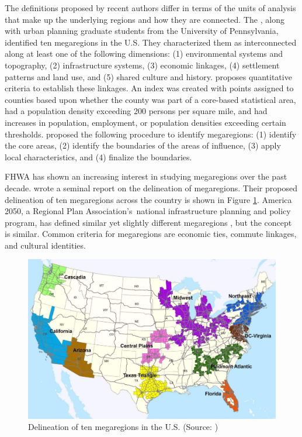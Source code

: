 The definitions proposed by recent authors differ in terms of the units of analysis that make up the underlying regions and how they are connected. The \cite{rpa06}, along with urban planning graduate students from the University of Pennsylvania, identified ten megaregions in the U.S. They characterized them as interconnected along at least one of the following dimensions: (1) environmental systems and topography, (2) infrastructure systems, (3) economic linkages, (4) settlement patterns and land use, and (5) shared culture and history. \cite{hagler09} proposes quantitative criteria to establish these linkages. An index was created with points assigned to counties based upon whether the county was part of a core-based statistical area, had a population density exceeding 200 persons per square mile, and had increases in population, employment, or population densities exceeding certain thresholds. \cite{ross08} proposed the following procedure to identify megaregions: (1) identify the core areas, (2) identify the boundaries of the areas of influence, (3) apply local characteristics, and (4) finalize the boundaries.

FHWA has shown an increasing interest in studying megaregions over the past decade. \cite{ross09c} wrote a seminal report on the delineation of megaregions. Their proposed delineation of ten megaregions across the country is shown in Figure \ref{fig:ross-megaregions}. America 2050, a Regional Plan Association's~national infrastructure planning and policy program, has defined similar yet slightly different megaregions \citep{rpa06}, but the concept is similar. Common criteria for megaregions are economic ties, commute linkages, and cultural identities.

\begin{figure}
\centering
\includegraphics[width=6.5in]{graphics/02-megaregionsAccordingToRoss2009}
\caption[Delineation of ten megaregions in the U.S.]{Delineation of ten megaregions in the U.S. (Source: \cite{ross09b})}
\label{fig:ross-megaregions}
\end{figure}

